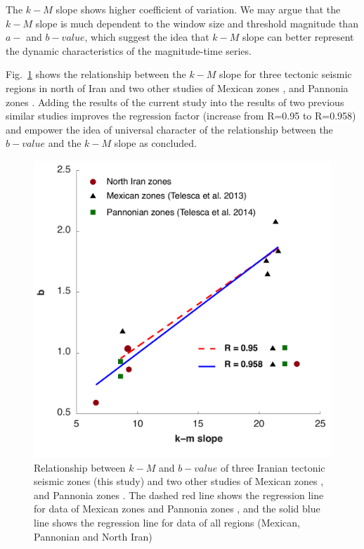  \noindent
The $k-M$ slope shows higher coefficient of variation. We may argue that the $k-M$ slope is much dependent to the window size and threshold magnitude than $a-$ and $b-value$, which suggest the idea that $k-M$ slope can better represent the dynamic characteristics of the magnitude-time series. 
 
 

 
 \noindent
 Fig.~\ref{fig:regression} shows the relationship between the $k-M$ slope for three tectonic seismic regions in north of Iran and two other studies of Mexican zones \citep{Telesca2013}, and Pannonia zones \citep{Telesca2014}. Adding the results of the current study into the results of two previous similar studies improves the regression factor (increase from R=0.95 to R=0.958) and empower the idea of universal character of the relationship between the $b-value$ and the $k-M$ slope as \citet{Telesca2014} concluded. 

\begin{figure} [ht]
\centering
\includegraphics[scale=0.3]{figures/pdf/Figure07.pdf} 
\caption{ Relationship between $k-M$ and $b-value$ of three Iranian tectonic seismic zones (this study) and two other studies of Mexican zones \citep{Telesca2013}, and Pannonia zones \citep{Telesca2014}. The dashed red line shows the regression line for data of  Mexican zones and Pannonia zones \citep{Telesca2014}, and the solid blue line shows the regression line for data of all regions (Mexican, Pannonian and North Iran)}
\label{fig:regression}
\end{figure}


